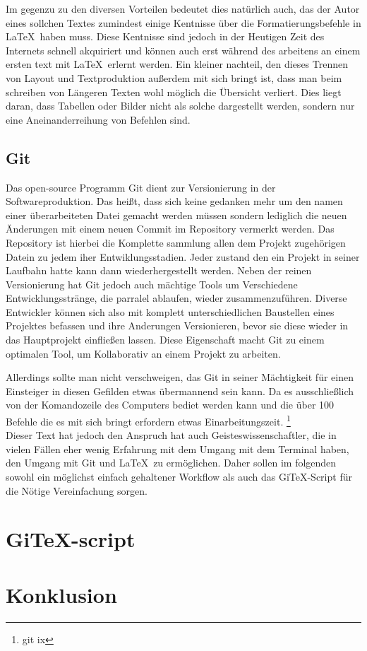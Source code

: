 \documentclass[12pt,a4paper]{scrartcl}
\begin{document}
Im gegenzu zu den diversen Vorteilen bedeutet dies natürlich auch, das der Autor eines sollchen Textes zumindest einige Kentnisse über die Formatierungsbefehle in \LaTeX \ haben muss. Diese Kentnisse sind jedoch in der Heutigen Zeit des Internets schnell akquiriert und können auch erst während des arbeitens an einem ersten text mit \LaTeX \ erlernt werden. Ein kleiner nachteil, den dieses Trennen von Layout und Textproduktion außerdem mit sich bringt ist, dass man beim schreiben von Längeren Texten wohl möglich die Übersicht verliert. Dies liegt daran, dass Tabellen oder Bilder nicht als solche dargestellt werden, sondern nur eine Aneinanderreihung von Befehlen sind.

\subsection{Git}

Das open-source Programm Git dient zur Versionierung in der Softwareproduktion. Das heißt, dass sich keine gedanken mehr um den namen einer überarbeiteten Datei gemacht werden müssen sondern lediglich die neuen Änderungen mit einem neuen Commit im Repository vermerkt werden. Das Repository ist hierbei die Komplette sammlung allen dem Projekt zugehörigen Datein zu jedem iher Entwiklungsstadien. Jeder zustand den ein Projekt in seiner Laufbahn hatte kann dann wiederhergestellt werden. Neben der reinen Versionierung hat Git jedoch auch mächtige Tools um Verschiedene Entwicklungsstränge, die parralel ablaufen, wieder zusammenzuführen. Diverse Entwickler können sich also mit komplett unterschiedlichen Baustellen eines Projektes befassen und ihre Anderungen Versionieren, bevor sie diese wieder in das Hauptprojekt einfließen lassen. Diese Eigenschaft macht Git zu einem optimalen Tool, um Kollaborativ an einem Projekt zu arbeiten. 

Allerdings sollte man nicht verschweigen, das Git in seiner Mächtigkeit für einen Einsteiger in diesen Gefilden etwas übermannend sein kann. Da es ausschließlich von der Komandozeile des Computers bediet werden kann und die über 100 Befehle die es mit sich bringt erfordern etwas Einarbeitungszeit. \footnote{git ix} 
\bigskip \\
Dieser Text hat jedoch den Anspruch hat auch Geisteswissenschaftler, die in vielen Fällen eher wenig Erfahrung mit dem Umgang mit dem Terminal haben, den Umgang mit Git und \LaTeX \ zu ermöglichen. Daher sollen im folgenden sowohl ein möglichst einfach gehaltener Workflow als auch das GiTeX-Script für die Nötige Vereinfachung sorgen.

\section{GiTeX-script}



\section{Konklusion}
\end{document}
